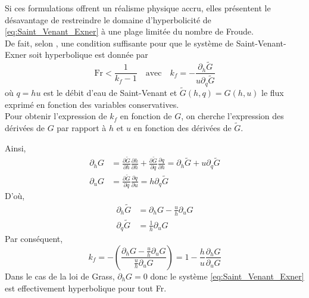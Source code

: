 \documentclass[11pt, a4paper, oneside]{report}
\begin{document}
Si ces formulations offrent un réalisme physique accru, elles présentent le désavantage de restreindre le domaine d'hyperbolicité de \eqref{eq:Saint_Venant_Exner} à une plage limitée du nombre de Froude. \\
De fait, selon \cite{stecca2012numerical}, une condition suffisante pour que le système de Saint-Venant-Exner soit hyperbolique est donnée par
\begin{equation} \label{eq:Condition_suffisante_hyperbolicite}
    \text{Fr} < \frac{1}{k_f - 1} \quad \text{avec} \quad k_f = -\frac{\partial_h \widetilde{G}}{u \partial_q \widetilde{G}}
\end{equation}
où $q = hu$ est le débit d'eau de Saint-Venant et $\widetilde{G}(h, q) = G(h, u)$ le flux exprimé en fonction des variables conservatives. \\
Pour obtenir l'expression de $k_f$ en fonction de $G$, on cherche l'expression des dérivées de $G$ par rapport à $h$ et $u$ en fonction des dérivées de $\widetilde{G}$. \\
\begin{samepage}
Ainsi,
\begin{equation}
    \begin{aligned}
        \partial_h G & = \frac{\partial \widetilde{G}}{\partial h} \frac{\partial h}{\partial h} + \frac{\partial \widetilde{G}}{\partial q} \frac{\partial q}{\partial h} = \partial_h \widetilde{G} + u \partial_q \widetilde{G} \\
        \partial_u G & = \frac{\partial \widetilde{G}}{\partial q} \frac{\partial q}{\partial u} = h \partial_q \widetilde{G}
    \end{aligned}
\end{equation}
D'où,
\begin{equation}
    \begin{aligned}
        \partial_h \widetilde{G} & = \partial_h G - \frac{u}{h} \partial_u G \\
        \partial_q \widetilde{G} & = \frac{1}{h} \partial_u G
    \end{aligned}
\end{equation}
Par conséquent,
\begin{equation}
    k_f = - \left( \frac{\partial_h G - \frac{u}{h} \partial_u G}{\frac{u}{h} \partial_u G} \right) = 1 - \frac{h}{u} \frac{\partial_h G}{\partial_u G}
\end{equation}
Dans le cas de la loi de Grass, $\partial_h G = 0$ donc le système \eqref{eq:Saint_Venant_Exner} est effectivement hyperbolique pour tout Fr. \\
\end{samepage}
\end{document}
